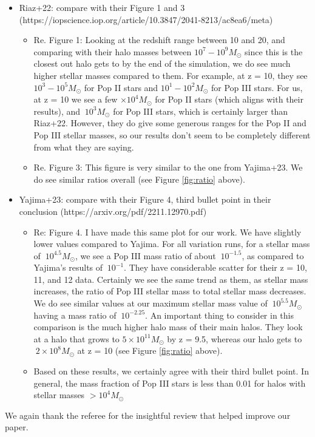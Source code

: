 \documentclass[11pt]{article}
\begin{document}
\begin{itemize}
    \item Riaz+22: compare with their Figure 1 and 3 (https://iopscience.iop.org/article/10.3847/2041-8213/ac8ea6/meta)
    \begin{itemize}
        \item Re. Figure 1: Looking at the redshift range between 10 and 20, and comparing with their halo masses between $10^7 - 10^9 M_\odot$ since this is the closest out halo gets to by the end of the simulation, we do see much higher stellar masses compared to them. For example, at z = 10, they see $10^3 - 10^5 M_\odot$ for Pop II stars and $10^1 - 10^2 M_\odot$ for Pop III stars. For us, at z = 10 we see a few $\times 10^4 M_\odot$ for Pop II stars (which aligns with their results), and $~10^{3} M_{\odot}$ for Pop III stars, which is certainly larger than Riaz+22. However, they do give some generous ranges for the Pop II and Pop III stellar masses, so our results don't seem to be completely different from what they are saying.
        \item Re. Figure 3: This figure is very similar to the one from Yajima+23. We do see similar ratios overall (see Figure \ref{fig:ratio} above).
    \end{itemize}
    \item Yajima+23: compare with their Figure 4, third bullet point in their conclusion (https://arxiv.org/pdf/2211.12970.pdf)
    \begin{itemize}
        \item Re: Figure 4. I have made this same plot for our work. We have slightly lower values compared to Yajima. For all variation runs, for a stellar mass of $~10^{4.5} M_\odot$, we see a Pop III mass ratio of about $~10^{-1.5}$, as compared to Yajima's results of $~10^{-1}$. They have considerable scatter for their z = 10, 11, and 12 data. Certainly we see the same trend as them, as stellar mass increases, the ratio of Pop III stellar mass to total stellar mass decreases. We do see similar values at our maximum stellar mass value of $~10^{5.5} M_\odot$ having a mass ratio of $~10^{-2.25}$. An important thing to consider in this comparison is the much higher halo mass of their main halos. They look at a halo that grows to $5 \times 10^{11} M_\odot$ by z = 9.5, whereas our halo gets to $~2 \times 10^{8} M_\odot$ at z = 10 (see Figure \ref{fig:ratio} above).
        \item Based on these results, we certainly agree with their third bullet point. In general, the mass fraction of Pop III stars is less than 0.01 for halos with stellar masses $> 10^{4} M_\odot$ 
    \end{itemize}
\end{itemize}

We again thank the referee for the insightful review that helped
improve our paper.



\end{document}
